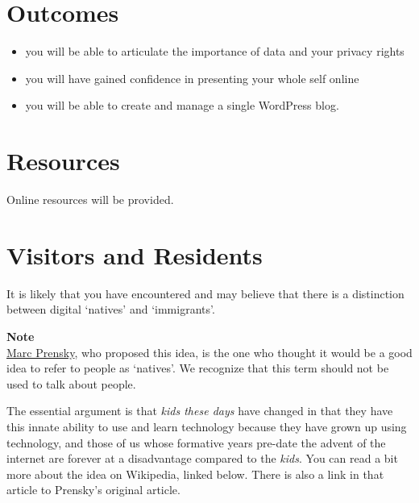 \documentclass[
]{book}
\providecommand{\tightlist}{%
  \setlength{\itemsep}{0pt}\setlength{\parskip}{0pt}}
\begin{document}
\hypertarget{outcomes}{%
\section*{Outcomes}\label{outcomes}}

\begin{itemize}
\tightlist
\item
  you will be able to articulate the importance of data and your privacy rights\\
\item
  you will have gained confidence in presenting your whole self online\\
\item
  you will be able to create and manage a single WordPress blog.
\end{itemize}

\hypertarget{resources-4}{%
\section*{Resources}\label{resources-4}}

Online resources will be provided.

\hypertarget{visitors-and-residents}{%
\section{Visitors and Residents}\label{visitors-and-residents}}

It is likely that you have encountered and may believe that there is a distinction between digital `natives' and `immigrants'.

\begin{caution}
\textbf{Note}\\
\href{https://marcprensky.com/}{Marc Prensky}, who proposed this idea,
is the one who thought it would be a good idea to refer to people as
`natives'. We recognize that this term should not be used to talk about
people.
\end{caution}

The essential argument is that \emph{kids these days} have changed in that they have this innate ability to use and learn technology because they have grown up using technology, and those of us whose formative years pre-date the advent of the internet are forever at a disadvantage compared to the \emph{kids}. You can read a bit more about the idea on Wikipedia, linked below. There is also a link in that article to Prensky's original article.
\end{document}
